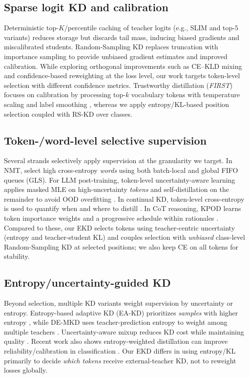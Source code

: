 \documentclass[11pt]{article}
\begin{document}
\subsection{Sparse logit KD and calibration}
Deterministic top-$K$/percentile caching of teacher logits (e.g., SLIM \citep{raman2023slim} and top-$5$ variants) reduces storage but discards tail mass, inducing biased gradients and miscalibrated students.
Random-Sampling KD \citep{anshumann2025sparse} replaces truncation with importance sampling to provide unbiased gradient estimates and improved calibration.
While exploring orthogonal improvements such as CE--KLD mixing and confidence-based reweighting at the loss level, our work targets token-level selection with different confidence metrics.
Trustworthy distillation (\emph{FIRST}) focuses on calibration by processing top-$k$ vocabulary tokens with temperature scaling and label smoothing \citep{shum2024first}, whereas we apply entropy/KL-based position selection coupled with RS-KD over classes.

\subsection{Token-/word-level selective supervision} Several strands selectively apply supervision at the granularity we target. In NMT, \citet{wang2021selectivekd} select high cross-entropy \emph{words} using both batch-local and global FIFO queues (GLS). For LLM post-training, token-level uncertainty-aware learning applies masked MLE on high-uncertainty \emph{tokens} and self-distillation on the remainder to avoid OOD overfitting \citep{liu2025tokenlevel}. In continual KD, token-level cross-entropy is used to quantify when and where to distill \citep{zhang2023continualkd}. In CoT reasoning, KPOD learns token importance weights and a progressive schedule within rationales \citep{feng2024kpod}. Compared to these, our EKD selects tokens using teacher-centric uncertainty (entropy and teacher-student KL) and couples selection with \emph{unbiased} class-level Random-Sampling KD at selected positions; we also keep CE on all tokens for stability.

\subsection{Entropy/uncertainty-guided KD} Beyond selection, multiple KD variants weight supervision by uncertainty or entropy. Entropy-based adaptive KD (EA-KD) prioritizes \emph{samples} with higher entropy \citep{su2023eakd}, while DE-MKD uses teacher-prediction entropy to weight among multiple teachers \citep{cheng2024demkd}. Uncertainty-aware mixup reduces KD cost while maintaining quality \citep{xu2023unix}. Recent work also shows entropy-weighted distillation can improve reliability/calibration in classification \citep{guo2024entropykd}. Our EKD differs in using entropy/KL primarily to decide \emph{which tokens} receive external-teacher KD, not to reweight losses globally.
\end{document}
